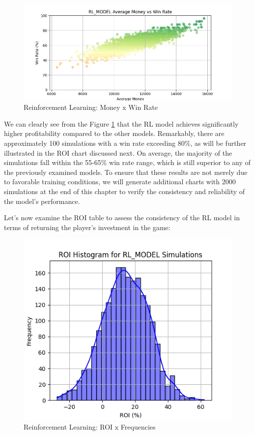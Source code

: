 \documentclass[a4paper,12pt]{report}
\begin{document}
\begin{figure}[h]
\begin{center}
\includegraphics[scale=0.6]{figures/graphs/rl_money_wr_big.png}
\end{center}
\caption{Reinforcement Learning: Money x Win Rate}
\label{fig:rl_wr}
\end{figure}

\baselineskip

We can clearly see from the Figure \ref{fig:rl_wr} that the RL model achieves significantly higher profitability compared to the other models. Remarkably, there are approximately 100 simulations with a win rate exceeding 80\%, as will be further illustrated in the ROI chart discussed next. On average, the majority of the simulations fall within the 55-65\% win rate range, which is still superior to any of the previously examined models. To ensure that these results are not merely due to favorable training conditions, we will generate additional charts with 2000 simulations at the end of this chapter to verify the consistency and reliability of the model's performance.

Let's now examine the ROI table to assess the consistency of the RL model in terms of returning the player's investment in the game:

\begin{figure}[h]
\begin{center}
\includegraphics[scale=0.6]{figures/graphs/rl_roi.png}
\end{center}
\caption{Reinforcement Learning: ROI x Frequencies}
\label{fig:rl_roi}
\end{figure}
\end{document}
